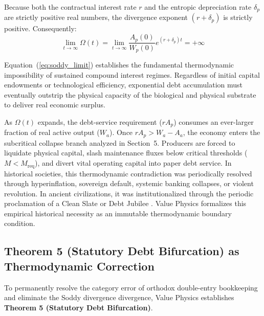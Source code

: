 \documentclass[preprint,12pt,authoryear]{elsarticle}
\theoremstyle{definition}
\begin{document}
Because both the contractual interest rate $r$ and the entropic depreciation rate $\delta_p$ are strictly positive real numbers, the divergence exponent $(r + \delta_p)$ is strictly positive. Consequently:
\begin{equation}
\lim_{t \to \infty} \Omega(t) = \lim_{t \to \infty} \frac{A_p(0)}{W_p(0)} e^{(r + \delta_p)t} = +\infty \label{eq:soddy_limit}
\end{equation}

Equation~(\ref{eq:soddy_limit}) establishes the fundamental thermodynamic impossibility of sustained compound interest regimes. Regardless of initial capital endowments or technological efficiency, exponential debt accumulation must eventually outstrip the physical capacity of the biological and physical substrate to deliver real economic surplus. 

As $\Omega(t)$ expands, the debt-service requirement ($r A_p$) consumes an ever-larger fraction of real active output ($W_a$). Once $r A_p > W_a - A_a$, the economy enters the subcritical collapse branch analyzed in Section~5. Producers are forced to liquidate physical capital, slash maintenance fluxes below critical thresholds ($M < M_{\text{req}}$), and divert vital operating capital into paper debt service. In historical societies, this thermodynamic contradiction was periodically resolved through hyperinflation, sovereign default, systemic banking collapses, or violent revolution. In ancient civilizations, it was institutionalized through the periodic proclamation of a Clean Slate or Debt Jubilee \citep{hudson2018}. Value Physics formalizes this empirical historical necessity as an immutable thermodynamic boundary condition.

\subsection{Theorem 5 (Statutory Debt Bifurcation) as Thermodynamic Correction}

To permanently resolve the category error of orthodox double-entry bookkeeping and eliminate the Soddy divergence divergence, Value Physics establishes \textbf{Theorem 5 (Statutory Debt Bifurcation)}.
\end{document}
